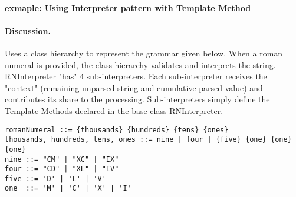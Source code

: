 \documentclass{book}
\begin{document}
\begin{figure}[H]
\begin{floatrow}
\end{floatrow}
\end{figure}



\paragraph{exmaple: Using Interpreter pattern with Template Method}

\paragraph{Discussion.}
Uses a class hierarchy to represent the grammar given below. When a roman numeral is provided, the class hierarchy validates and interprets the string.
RNInterpreter "has" 4 sub-interpreters. Each sub-interpreter receives the "context" (remaining unparsed string and cumulative parsed value) and contributes its share to the processing.
Sub-interpreters simply define the Template Methods declared in the base class RNInterpreter.

\begin{lstlisting}
romanNumeral ::= {thousands} {hundreds} {tens} {ones}
thousands, hundreds, tens, ones ::= nine | four | {five} {one} {one} {one}
nine ::= "CM" | "XC" | "IX"
four ::= "CD" | "XL" | "IV"
five ::= 'D' | 'L' | 'V'
one  ::= 'M' | 'C' | 'X' | 'I'
\end{lstlisting}
\end{document}
